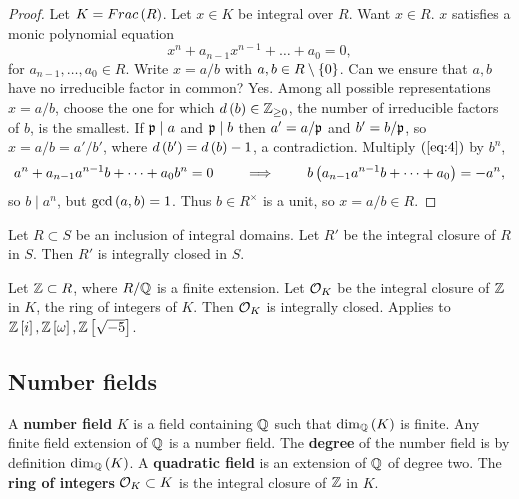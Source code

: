 \begin{proof}
Let $ K = Frac\left( R \right) $. Let $ x \in K $ be integral over $ R $. Want $ x \in R $. $ x $ satisfies a monic polynomial equation
\begin{equation}
\label{eq:4}
x^n + a_{n - 1}x^{n - 1} + \dots + a_0 = 0,
\end{equation}
for $ a_{n - 1}, \dots, a_0 \in R $. Write $ x = a / b $ with $ a, b \in R \setminus \left\{ 0 \right\} $. Can we ensure that $ a, b $ have no irreducible factor in common? Yes. Among all possible representations $ x = a / b $, choose the one for which $ d\left( b \right) \in \mathbb{Z}_{\ge 0} $, the number of irreducible factors of $ b $, is the smallest. If $ \mathfrak{p} \mid a $ and $ \mathfrak{p} \mid b $ then $ a' = a / \mathfrak{p} $ and $ b' = b / \mathfrak{p} $, so $ x = a / b = a' / b' $, where $ d\left( b' \right) = d\left( b \right) - 1 $, a contradiction. Multiply $ \left( \ref{eq:4} \right) $ by $ b^n $,
$$ a^n + a_{n - 1}a^{n - 1}b + \dots + a_0b^n = 0 \qquad \implies \qquad b\left( a_{n - 1}a^{n - 1}b + \dots + a_0 \right) = -a^n, $$
so $ b \mid a^n $, but $ \gcd\left( a, b \right) = 1 $. Thus $ b \in R^\times $ is a unit, so $ x = a / b \in R $.
\end{proof}

\begin{theorem}
Let $ R \subset S $ be an inclusion of integral domains. Let $ R' $ be the integral closure of $ R $ in $ S $. Then $ R' $ is integrally closed in $ S $.
\end{theorem}

\begin{example*}
Let $ \mathbb{Z} \subset R $, where $ R / \mathbb{Q} $ is a finite extension. Let $ \mathcal{O}_K $ be the integral closure of $ \mathbb{Z} $ in $ K $, the ring of integers of $ K $. Then $ \mathcal{O}_K $ is integrally closed. Applies to $ \mathbb{Z}\left[ i \right], \mathbb{Z}\left[ \omega \right], \mathbb{Z}\left[ \sqrt{-5} \right] $.
\end{example*}

\pagebreak

\subsection{Number fields}

A \textbf{number field} $ K $ is a field containing $ \mathbb{Q} $ such that $ \dim_{\mathbb{Q}}\left( K \right) $ is finite. Any finite field extension of $ \mathbb{Q} $ is a number field. The \textbf{degree} of the number field is by definition $ \dim_{\mathbb{Q}}\left( K \right) $. A \textbf{quadratic field} is an extension of $ \mathbb{Q} $ of degree two. The \textbf{ring of integers} $ \mathcal{O}_K \subset K $ is the integral closure of $ \mathbb{Z} $ in $ K $.

